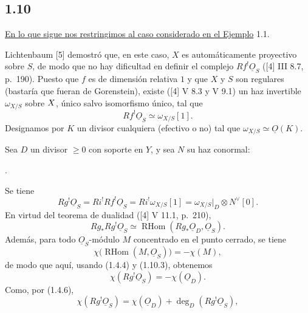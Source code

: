 \pageoriginale

\subsection*{1.10}
\underline{En lo que sigue nos restringimos al caso considerado en el Ejemplo}
1.1.

Lichtenbaum [5] demostró que, en este caso, $X$ es automáticamente proyectivo
sobre $S$, de modo que no hay dificultad en definir el complejo
$Rf^{!}\underline{O}_S$ ([4] III 8.7, p.~190). Puesto que $f$ es de dimensión
relativa $1$ y que $X$ y $S$ son regulares (bastaría que fueran de Gorenstein),
existe ([4] V 8.3 y V 9.1) un haz invertible $\omega_{X/S}$ sobre
$\sisi{S}{X}$, único salvo isomorfismo único, tal que
\begin{equation}\tag{1.10.1}
Rf^{!}\underline{O}_S\simeq\omega_{X/S}[1].
\end{equation}
Designamos por $K$ un divisor cualquiera (efectivo o no) tal que
$\omega_{X/S}\simeq\underline{O}(K)$.

Sea $D$ un divisor $\geq0$ con soporte en $Y$, y sea $N$ su haz conormal:
\begin{center}
\qquad .
\end{center}
Se tiene
\begin{equation}\tag{1.10.2}
Rg^{!}\underline{O}_S
=Ri^{!}Rf^{!}\underline{O}_S
=Ri^{!}\omega_{X/S}[1]
=\omega_{X/S}\big|_D\otimes N^{\vee}[0].
\end{equation}
En virtud del teorema de dualidad ([4] V 11.1, p.~210),
\begin{equation}\tag{1.10.3}
Rg_*Rg^{!}\underline{O}_S
\simeq\operatorname{RHom}(Rg_*\underline{O}_D,\underline{O}_S).
\end{equation}
Además, para todo $\underline{O}_S$-módulo $M$ concentrado en el punto cerrado,
se tiene
\begin{equation}\tag{1.10.4}
\chi\bigl(\operatorname{RHom}(M,\underline{O}_S)\bigr)=-\chi(M),
\end{equation}
de modo que aquí, usando (1.4.4) y (1.10.3), obtenemos
\begin{equation*}
\chi(Rg^{!}\underline{O}_S)=-\chi(\underline{O}_D).
\end{equation*}
Como, por (1.4.6),
\begin{equation*}
\chi(Rg^{!}\underline{O}_S)
=\chi(\underline{O}_D)+\deg_D(Rg^{!}\underline{O}_S),
\end{equation*}

